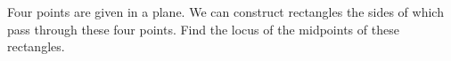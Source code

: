 Four points are given in a plane. We can construct rectangles the sides of which pass through these four points. Find the locus of the midpoints of these rectangles.
